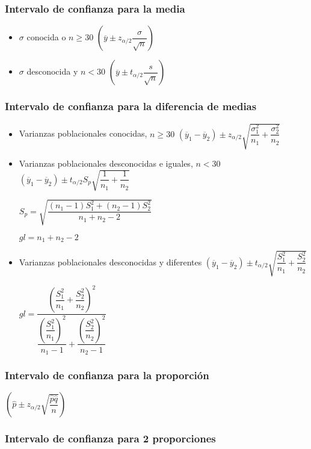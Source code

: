 \subsubsection{Intervalo de confianza para la media}
\begin{itemize}
	\item $\sigma$ conocida o $n\geq30$
	$(\overline{y}\pm z_{\alpha/2}\dfrac{\sigma}{\sqrt{n}})$
	\item $\sigma$ desconocida y $n<30$
	$(\overline{y}\pm t_{\alpha/2}\dfrac{s}{\sqrt{n}})$
\end{itemize}

\subsubsection{Intervalo de confianza para la diferencia de medias}

\begin{itemize}
	\item Varianzas poblacionales conocidas, $n\ge30$ $(\overline{y}_1- \overline{y}_2)\pm z_{\alpha/2}\sqrt{\dfrac{\sigma_1^2}{n_1}+\dfrac{\sigma_2^2}{n_2}}$
	\item Varianzas poblacionales desconocidas e iguales, $n<30$ $(\overline{y}_1- \overline{y}_2)\pm t_{\alpha/2}S_p\sqrt{\dfrac{1}{n_1}+\dfrac{1}{n_2}}$ 
	
	$S_p=\sqrt{\dfrac{(n_1-1)S_1^2+(n_2-1)S_2^2}{n_1+n_2-2}}$
	
	$gl=n_1+n_2-2$
	\item Varianzas poblacionales desconocidas y diferentes $(\overline{y}_1- \overline{y}_2)\pm t_{\alpha/2}\sqrt{\dfrac{S_1^2}{n_1}+\dfrac{S_2^2}{n_2}}$ 
	
	$gl=\dfrac{\left( \dfrac{S_1^2}{n_1}+\dfrac{S_2^2}{n_2}\right) ^2}{\dfrac{\left( \dfrac{S_1^2}{n_1}\right) ^2}{n_1-1}+\dfrac{\left( \dfrac{S_2^2}{n_2}\right) ^2}{n_2-1}}$
\end{itemize}


\subsubsection{Intervalo de confianza para la proporción}

$\left( \hat{p}\pm z_{\alpha/2}\sqrt{\dfrac{\hat{p}\hat{q}}{n}}\right) $

\subsubsection{Intervalo de confianza para 2 proporciones}

